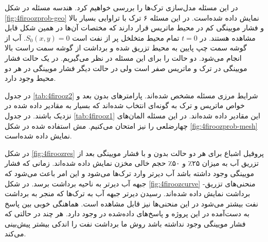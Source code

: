 در این مسئله مدل‌سازی ترک‌ها را بررسی خواهیم کرد. هندسه مسئله در شکل \ref{fig:4firoozprob-geo} نمایش داده ‌شده‌است. در این مسئله ۶ ترک با تراوایی بسیار بالا و فشار مویینگی کم در محیط ماتریس قرار دارند که مختصات آن‌ها در همین شکل قابل مشاهده هستند. در $t=0$ تمام محیط متخلخل پر از نفت است $S_0(x,y) = 0$. آب از گوشه سمت چپ پایین به محیط تزریق شده و برداشت از گوشه سمت راست بالا انجام می‌شود. دو حالت را برای این مسئله در نظر می‌گیریم. در یک حالت فشار مویینگی در ترک و ماتریس صفر است ولی در حالت دیگر فشار مویینگی در هر دو محیط وجود دارد.

در جدول \ref{tab:4firooz2} شرایط مرزی مسئله مشخص شده‌اند. پارامتر‌های بدون بعد و خواص ماتریس و ترک به گونه‌ای انتخاب شده‌اند که بسیار به مقادیر داده شده در \cite{hoteitf} نزدیک باشند. در جدول \ref{tab:4firooz1} این مقادیر داده‌ شده‌اند. در این مسئله المان‌های چهارضلعی را نیز امتحان می‌کنیم. مش استفاده شده در شکل \ref{fig:4firoozprob-mesh} نمایش داده شده‌است.

در شکل \ref{fig:4firoozres} پروفیل اشباع برای هر دو حالت بدون و با فشار مویینگی بعد از تزریق آب به میزان ۲۵٪ و ۵۰٪ حجم خالی مخزن نمایش داده شده‌اند. زمانی که فشار مویینگی وجود داشته باشد آب دیرتر وارد ترک‌ها می‌شود و این امر باعث می‌شود که جبهه آب دیرتر به ناحیه برداشت برسد. در شکل \ref{fig:4firoozcurve} منحنی‌های تزریق-برداشت نمایش داده شده‌اند. رسیدن دیرتر جبهه آب به ترک‌ها که منجر به برداشت نفت بیشتر می‌شود در این منحنی‌ها نیز قابل مشاهده است. هماهنگی خوبی بین پاسخ به دست‌آمده در این پروژه و پاسخ‌های داده‌شده در \cite{hoteitf} وجود دارد. هر چند در حالتی که فشار مویینگی وجود نداشته باشد روش ما برداشت نفت را اندکی بیشتر پیش‌بینی می‌کند.

